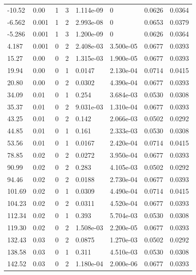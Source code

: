 \documentclass[preview]{standalone}
\begin{document}
{{\begin{tabular}{L{1.2cm}C{1.2cm} C{0.3cm}C{0.5cm} C{1.4cm}C{1.4cm} C{1.4cm}C{1.4cm}}
  -10.52  &  0.00  & 1     &  3 &  1.114e-09  & 0  & 0.0626 &  0.0364   \\ 
  -6.562  &  0.001  & 1     &  2 &  2.993e-08  & 0  & 0.0653 &  0.0379   \\ 
  -5.286  &  0.001  & 1     &  3 &  1.200e-09  & 0  & 0.0626 &  0.0364   \\ 
  4.187  &  0.001  & 0     &  2 &  2.408e-03  & 3.500e-05  & 0.0677 &  0.0393   \\ 
  15.27  &  0.00  & 0     &  2 &  1.315e-03  & 1.900e-05  & 0.0677 &  0.0393   \\ 
  19.94  &  0.00  & 0     &  1 &  0.0147  & 2.130e-04  & 0.0714 &  0.0415   \\ 
  20.80  &  0.00  & 0     &  2 &  0.0302  & 4.390e-04  & 0.0677 &  0.0393   \\ 
  34.09  &  0.01  & 0     &  1 &  0.254  & 3.684e-03  & 0.0530 &  0.0308   \\ 
  35.37  &  0.01  & 0     &  2 &  9.031e-03  & 1.310e-04  & 0.0677 &  0.0393   \\ 
  43.25  &  0.01  & 0     &  2 &  0.142  & 2.066e-03  & 0.0502 &  0.0292   \\ 
  44.85  &  0.01  & 0     &  1 &  0.161  & 2.333e-03  & 0.0530 &  0.0308   \\ 
  53.56  &  0.01  & 0     &  1 &  0.0167  & 2.420e-04  & 0.0714 &  0.0415   \\ 
  78.85  &  0.02  & 0     &  2 &  0.0272  & 3.950e-04  & 0.0677 &  0.0393   \\ 
  90.99  &  0.02  & 0     &  2 &  0.283  & 4.105e-03  & 0.0502 &  0.0292   \\ 
  94.46  &  0.02  & 0     &  2 &  0.0188  & 2.730e-04  & 0.0677 &  0.0393   \\ 
  101.69  &  0.02  & 0     &  1 &  0.0309  & 4.490e-04  & 0.0714 &  0.0415   \\ 
  104.23  &  0.02  & 0     &  2 &  0.0311  & 4.520e-04  & 0.0677 &  0.0393   \\ 
  112.34  &  0.02  & 0     &  1 &  0.393  & 5.704e-03  & 0.0530 &  0.0308   \\ 
  119.30  &  0.02  & 0     &  2 &  1.508e-03  & 2.200e-05  & 0.0677 &  0.0393   \\ 
  132.43  &  0.03  & 0     &  2 &  0.0875  & 1.270e-03  & 0.0502 &  0.0292   \\ 
  138.58  &  0.03  & 0     &  1 &  0.311  & 4.510e-03  & 0.0530 &  0.0308   \\ 
  142.52  &  0.03  & 0     &  2 &  1.180e-04  & 2.000e-06  & 0.0677 &  0.0393   \\ 

\end{tabular}}}
\end{document}
